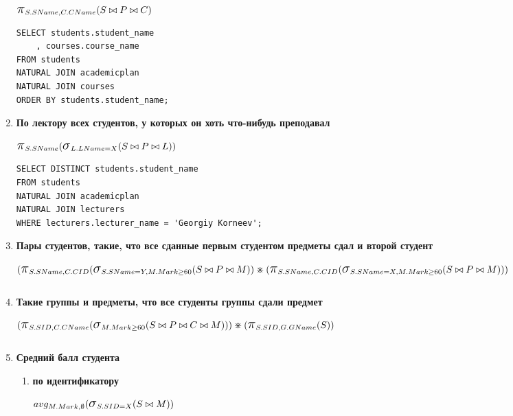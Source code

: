 \documentclass[12pt]{article}
\newcommand{\select}{\mbox{\Large$\sigma$}}
\newcommand{\project}{\mbox{\Large$\pi$}}
\begin{document}
\begin{enumerate}
		$ \project_{S.SName, C.CName} (S \bowtie P \bowtie C) $
        
		\begin{verbatim}
SELECT students.student_name
	, courses.course_name
FROM students 
NATURAL JOIN academicplan
NATURAL JOIN courses
ORDER BY students.student_name;
		\end{verbatim}
    
    \item \textbf{По лектору всех студентов, у которых он хоть что-нибудь преподавал}
	
	        $ \project_{S.SName} (\select_{L.LName = X } (S \bowtie P \bowtie L)) $
    
		\begin{verbatim}
SELECT DISTINCT students.student_name
FROM students 
NATURAL JOIN academicplan
NATURAL JOIN lecturers
WHERE lecturers.lecturer_name = 'Georgiy Korneev';
		\end{verbatim}
    
    \item \textbf{Пары студентов, такие, что все сданные первым студентом предметы сдал и второй студент}
    
    		$ (\project_{S.SName, C.CID} (\select_{S.SName = Y, M.Mark \ge 60} (S \bowtie P \bowtie M)) \divideontimes (\project_{S.SName, C.CID} (\select_{S.SName = X, M.Mark \ge 60} (S \bowtie P \bowtie M)))$
    
		\begin{verbatim}

		\end{verbatim}
    
    
    \item \textbf{Такие группы и предметы, что все студенты группы сдали предмет}

       		$ (\project_{S.SID, C.CName} (\select_{M.Mark \ge 60} (S \bowtie P \bowtie C \bowtie M))) \divideontimes (\project_{S.SID, G.GName} (S))$
   
		\begin{verbatim}

		\end{verbatim}
    
    
    \item \textbf{Средний балл студента}
       	\begin{enumerate}	
   			\item \textbf{по идентификатору}   		
				
				$ avg_{M.Mark, \emptyset} (\select_{S.SID = X} (S \bowtie M)) $
				

\end{enumerate}
\end{enumerate}
\end{document}
